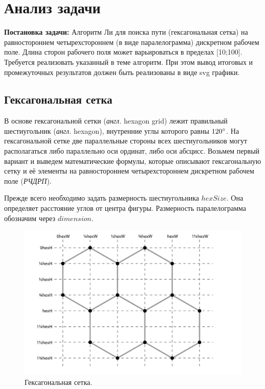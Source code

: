 \chapter{Анализ задачи}
\label{cha:analysis}
\textbf{Постановка задачи:} Алгоритм Ли для поиска пути (гексагональная сетка) на равностороннем 
четырехстороннем (в виде паралелограмма) дискретном рабочем поле. Длина сторон рабочего поля может
 варьироваться в пределах [10;100]. Требуется реализовать указанный в теме алгоритм. При этом вывод 
 итоговых и промежуточных результатов должен быть реализованы в виде svg графики.
 
\section{Гексагональная сетка}
В основе гексагональной сетки (\textit{англ.} hexagon grid) лежит правильный шестиугольник (\textit{англ.} hexagon), 
внутренние углы которого равны $120 \degree$. На гексагональной сетке две параллельные стороны 
всех шестиугольников могут располагаться либо параллельно оси ординат, либо оси абсцисс. Возьмем 
первый вариант и выведем математические формулы, которые описывают гексагональную сетку и 
её элементы на равностороннем четырехстороннем дискретном рабочем поле (\textit{РЧДРП}).
\par
Прежде всего необходимо задать размерность шестиугольника $hexSize$.
Она определяет расстояние углов от центра фигуры. 
Размерность паралелограмма обозначим через $dimension$.

\begin{figure}
	\centering
	\includegraphics[height=0.35\textheight]{inc/img/hexagon_grid}
	\caption{Гексагональная сетка.}
	\label{analysis:hexagonGridWithPoints}
\end{figure}

